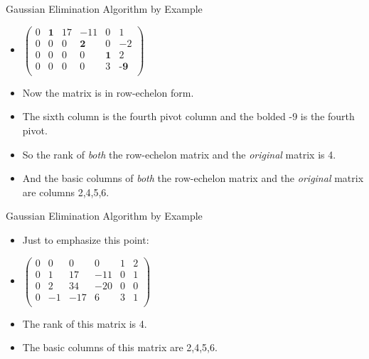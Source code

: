 \documentclass{beamer}
\begin{document}
\begin{frame}{Gaussian Elimination Algorithm by Example}

\begin{itemize}
\item $
\begin{pmatrix}
0 & \textbf{1} &  17   &          -11   &          0   &          1  \\
0 &         0  &   0   &   \textbf{2}   &          0   &          -2  \\
0 &         0  &   0   &           0    &  \textbf{1}  &           2  \\
0 &         0  &   0   &           0    &          3   &   \textbf{-9 } \\
\end{pmatrix}
$
\item Now the matrix is in row-echelon form.
\item The sixth column is the fourth pivot column and the bolded -9 is the
fourth pivot.
\item So the rank of \emph{both} the row-echelon matrix and the \emph{original}
matrix is 4.
\item And the basic columns of \emph{both} the row-echelon matrix and the \emph{original}
matrix are columns 2,4,5,6.
\end{itemize}
\end{frame}


\begin{frame}{Gaussian Elimination Algorithm by Example}

\begin{itemize}
\item Just to emphasize this point:
\item $
\begin{pmatrix}
0 & 0  &   0  &  0   &  1  &  2 \\
0 & 1  &  17  & -11  &  0  &  1  \\
0 & 2  &  34  & -20  &  0  &  0 \\
0 & -1 &  -17   &  6 &  3  &  1 \\
\end{pmatrix}
$
\item The rank of this matrix is 4.
\item The basic columns of this matrix are 2,4,5,6.
\end{itemize}
\end{frame}
\end{document}
